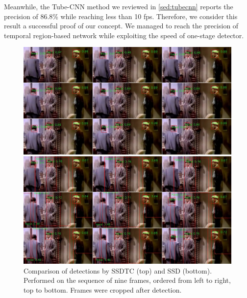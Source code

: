 Meanwhile, the Tube-CNN method we reviewed in \cref{sed:tubecnn} reports the precision of 86.8\% while reaching less than 10 fps. Therefore, we consider this result a successful proof of our concept. We managed to reach the precision of temporal region-based network while exploiting the speed of one-stage detector. 

\begin{figure}
    \centering
    \includegraphics[width=\textwidth]{img/ssdt_ssdtc_comp}
    \caption[Comparison of detections by SSDTC and SSD]{Comparison of detections by SSDTC (top) and SSD (bottom). Performed on the sequence of nine frames, ordered from left to right, top to bottom. Frames were cropped after detection.}
    \label{fig:ssdssdtccomp}
\end{figure}